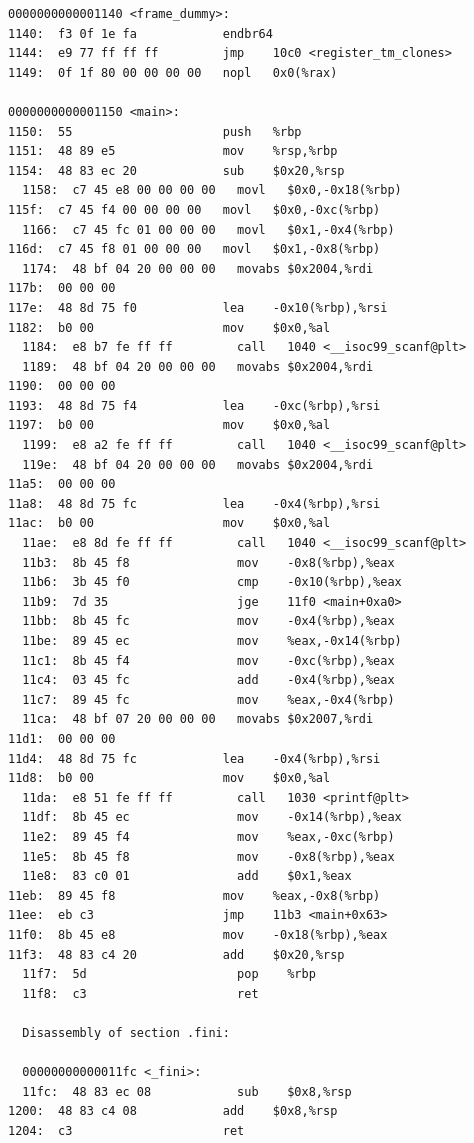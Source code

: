 \documentclass[UTF8,a4paper,10pt]{ctexart}
\begin{document}
\begin{verbatim}
0000000000001140 <frame_dummy>:
1140:  f3 0f 1e fa            endbr64
1144:  e9 77 ff ff ff         jmp    10c0 <register_tm_clones>
1149:  0f 1f 80 00 00 00 00   nopl   0x0(%rax)

0000000000001150 <main>:
1150:  55                     push   %rbp
1151:  48 89 e5               mov    %rsp,%rbp
1154:  48 83 ec 20            sub    $0x20,%rsp
  1158:  c7 45 e8 00 00 00 00   movl   $0x0,-0x18(%rbp)
115f:  c7 45 f4 00 00 00 00   movl   $0x0,-0xc(%rbp)
  1166:  c7 45 fc 01 00 00 00   movl   $0x1,-0x4(%rbp)
116d:  c7 45 f8 01 00 00 00   movl   $0x1,-0x8(%rbp)
  1174:  48 bf 04 20 00 00 00   movabs $0x2004,%rdi
117b:  00 00 00
117e:  48 8d 75 f0            lea    -0x10(%rbp),%rsi
1182:  b0 00                  mov    $0x0,%al
  1184:  e8 b7 fe ff ff         call   1040 <__isoc99_scanf@plt>
  1189:  48 bf 04 20 00 00 00   movabs $0x2004,%rdi
1190:  00 00 00
1193:  48 8d 75 f4            lea    -0xc(%rbp),%rsi
1197:  b0 00                  mov    $0x0,%al
  1199:  e8 a2 fe ff ff         call   1040 <__isoc99_scanf@plt>
  119e:  48 bf 04 20 00 00 00   movabs $0x2004,%rdi
11a5:  00 00 00
11a8:  48 8d 75 fc            lea    -0x4(%rbp),%rsi
11ac:  b0 00                  mov    $0x0,%al
  11ae:  e8 8d fe ff ff         call   1040 <__isoc99_scanf@plt>
  11b3:  8b 45 f8               mov    -0x8(%rbp),%eax
  11b6:  3b 45 f0               cmp    -0x10(%rbp),%eax
  11b9:  7d 35                  jge    11f0 <main+0xa0>
  11bb:  8b 45 fc               mov    -0x4(%rbp),%eax
  11be:  89 45 ec               mov    %eax,-0x14(%rbp)
  11c1:  8b 45 f4               mov    -0xc(%rbp),%eax
  11c4:  03 45 fc               add    -0x4(%rbp),%eax
  11c7:  89 45 fc               mov    %eax,-0x4(%rbp)
  11ca:  48 bf 07 20 00 00 00   movabs $0x2007,%rdi
11d1:  00 00 00
11d4:  48 8d 75 fc            lea    -0x4(%rbp),%rsi
11d8:  b0 00                  mov    $0x0,%al
  11da:  e8 51 fe ff ff         call   1030 <printf@plt>
  11df:  8b 45 ec               mov    -0x14(%rbp),%eax
  11e2:  89 45 f4               mov    %eax,-0xc(%rbp)
  11e5:  8b 45 f8               mov    -0x8(%rbp),%eax
  11e8:  83 c0 01               add    $0x1,%eax
11eb:  89 45 f8               mov    %eax,-0x8(%rbp)
11ee:  eb c3                  jmp    11b3 <main+0x63>
11f0:  8b 45 e8               mov    -0x18(%rbp),%eax
11f3:  48 83 c4 20            add    $0x20,%rsp
  11f7:  5d                     pop    %rbp
  11f8:  c3                     ret

  Disassembly of section .fini:

  00000000000011fc <_fini>:
  11fc:  48 83 ec 08            sub    $0x8,%rsp
1200:  48 83 c4 08            add    $0x8,%rsp
1204:  c3                     ret
\end{verbatim}
\end{document}
